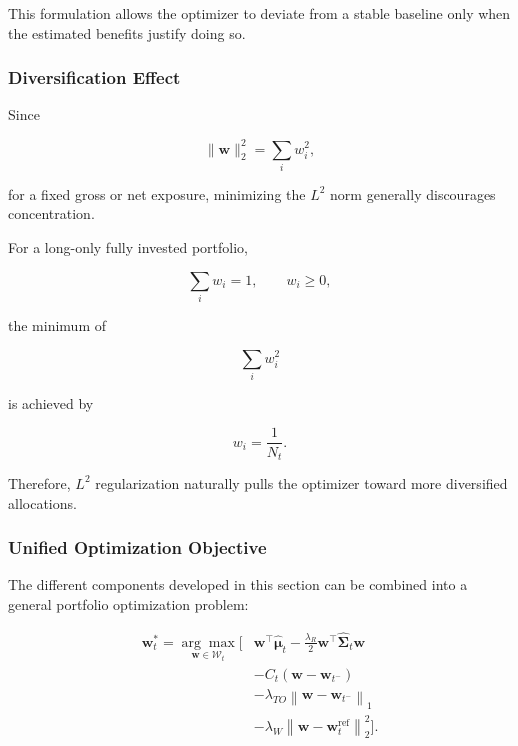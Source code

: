 \documentclass[11pt,a4paper]{article}
\begin{document}
This formulation allows the optimizer to deviate from a stable baseline only
when the estimated benefits justify doing so.


\subsubsection{Diversification Effect}

Since

\begin{equation}
\|\mathbf{w}\|_2^2
=
\sum_i w_i^2,
\end{equation}

for a fixed gross or net exposure, minimizing the $L^2$ norm generally
discourages concentration.

For a long-only fully invested portfolio,

\begin{equation}
\sum_i w_i=1,
\qquad
w_i\geq0,
\end{equation}

the minimum of

\begin{equation}
\sum_iw_i^2
\end{equation}

is achieved by

\begin{equation}
\boxed{
w_i
=
\frac{1}{N_t}.
}
\end{equation}

Therefore, $L^2$ regularization naturally pulls the optimizer toward more
diversified allocations.


\subsubsection{Unified Optimization Objective}

The different components developed in this section can be combined into a
general portfolio optimization problem:

\begin{equation}
\boxed{
\begin{aligned}
\mathbf{w}_t^{*}
=
\underset{\mathbf{w}\in\mathcal{W}_t}{\arg\max}
\Bigg[
&
\mathbf{w}^{\top}
\widehat{\boldsymbol{\mu}}_t
-
\frac{\lambda_R}{2}
\mathbf{w}^{\top}
\widehat{\boldsymbol{\Sigma}}_t
\mathbf{w}
\\
&
-
C_t
\left(
\mathbf{w}-\mathbf{w}_{t^-}
\right)
\\
&
-
\lambda_{TO}
\left\|
\mathbf{w}-\mathbf{w}_{t^-}
\right\|_1
\\
&
-
\lambda_W
\left\|
\mathbf{w}-\mathbf{w}_t^{\mathrm{ref}}
\right\|_2^2
\Bigg].
\end{aligned}
}
\end{equation}
\end{document}
